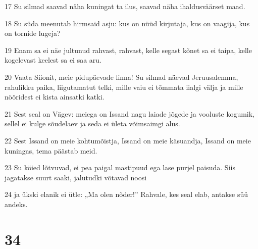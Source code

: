 \par 17 Su silmad saavad näha kuningat ta ilus, saavad näha ihaldusväärset maad.
\par 18 Su süda meenutab hirmsaid asju: kus on nüüd kirjutaja, kus on vaagija, kus on tornide lugeja?
\par 19 Enam sa ei näe jultunud rahvast, rahvast, kelle segast kõnet sa ei taipa, kelle kogelevast keelest sa ei saa aru.
\par 20 Vaata Siionit, meie pidupäevade linna! Su silmad näevad Jeruusalemma, rahulikku paika, liigutamatut telki, mille vaiu ei tõmmata iialgi välja ja mille nööridest ei kista ainsatki katki.
\par 21 Sest seal on Vägev: meiega on Issand nagu laiade jõgede ja vooluste kogumik, sellel ei kulge sõudelaev ja seda ei ületa võimsaimgi alus.
\par 22 Sest Issand on meie kohtumõistja, Issand on meie käsuandja, Issand on meie kuningas, tema päästab meid.
\par 23 Su köied lõtvuvad, ei pea paigal mastipuud ega lase purjel paisuda. Siis jagatakse suurt saaki, jalutudki võtavad noosi
\par 24 ja ükski elanik ei ütle: „Ma olen nõder!” Rahvale, kes seal elab, antakse süü andeks.

\chapter{34}

